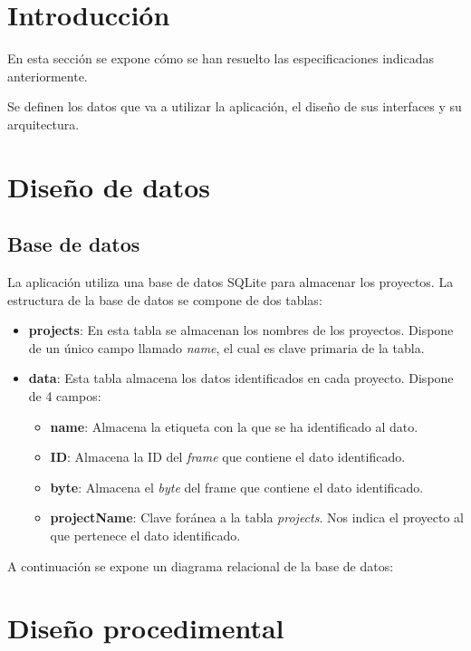 
\section{Introducción}

En esta sección se expone cómo se han resuelto las especificaciones indicadas anteriormente.

Se definen los datos que va a utilizar la aplicación, el diseño de sus interfaces y su arquitectura.

\section{Diseño de datos}

\subsection{Base de datos}

La aplicación utiliza una base de datos SQLite para almacenar los proyectos. La estructura de la base de datos se compone de dos tablas:

\begin{itemize}
\item
\textbf{projects}: En esta tabla se almacenan los nombres de los proyectos. Dispone de un único campo llamado \emph{name}, el cual es clave primaria de la tabla.
\item
\textbf{data}: Esta tabla almacena los datos identificados en cada proyecto. Dispone de 4 campos:
\begin{itemize}
\item
\textbf{name}: Almacena la etiqueta con la que se ha identificado al dato.
\item
\textbf{ID}: Almacena la ID del \emph{frame} que contiene el dato identificado.
\item
\textbf{byte}: Almacena el \emph{byte} del frame que contiene el dato identificado.
\item
\textbf{projectName}: Clave foránea a la tabla \emph{projects}. Nos indica el proyecto al que pertenece el dato identificado.
\end{itemize}
\end{itemize}

A continuación se expone un diagrama relacional de la base de datos:


\section{Diseño procedimental}

